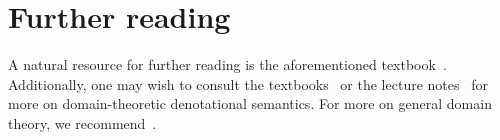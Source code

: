 \section{Further reading}

A natural resource for further reading is the aforementioned
textbook~\cite{Streicher2006}.
%
Additionally, one may wish to consult the
textbooks~\cite{Winskel1993,Gunter1992} or the lecture
notes~\cite{Plotkin1983,PittsWinskelFiore2012} for more on domain-theoretic denotational
semantics.
%
For more on general domain theory, we
recommend~\cite{AbramskyJung1994,GierzEtAl2003}.


